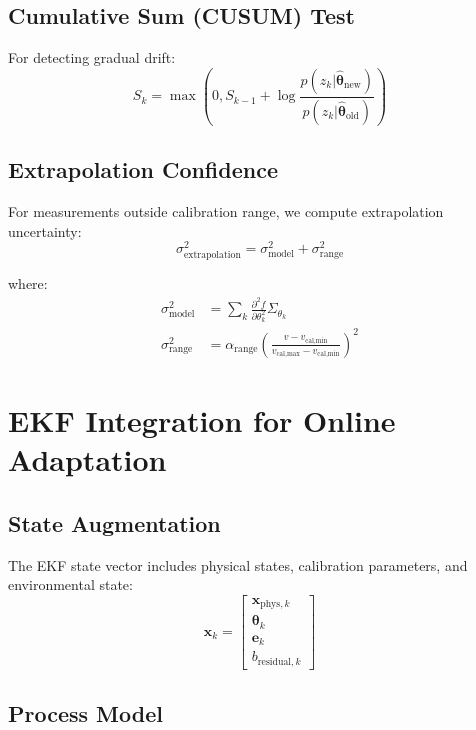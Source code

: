 \documentclass[11pt]{article}
\begin{document}
\subsection{Cumulative Sum (CUSUM) Test}

For detecting gradual drift:
\begin{equation}
S_k = \max(0, S_{k-1} + \log \frac{p(z_k | \hat{\bm{\theta}}_{\text{new}})}{p(z_k | \hat{\bm{\theta}}_{\text{old}})})
\end{equation}

\subsection{Extrapolation Confidence}

For measurements outside calibration range, we compute extrapolation uncertainty:
\begin{equation}
\sigma_{\text{extrapolation}}^2 = \sigma_{\text{model}}^2 + \sigma_{\text{range}}^2
\end{equation}

where:
\begin{align}
\sigma_{\text{model}}^2 &= \sum_{k} \frac{\partial^2 f}{\partial \theta_k^2} \Sigma_{\theta_k} \\
\sigma_{\text{range}}^2 &= \alpha_{\text{range}} \left(\frac{v - v_{\text{cal,min}}}{v_{\text{cal,max}} - v_{\text{cal,min}}}\right)^2
\end{align}

\section{EKF Integration for Online Adaptation}

\subsection{State Augmentation}

The EKF state vector includes physical states, calibration parameters, and environmental state:
\begin{equation}
\mathbf{x}_k = \begin{bmatrix}
\mathbf{x}_{\text{phys},k} \\
\bm{\theta}_k \\
\mathbf{e}_k \\
b_{\text{residual},k}
\end{bmatrix}
\end{equation}

\subsection{Process Model}
\end{document}
